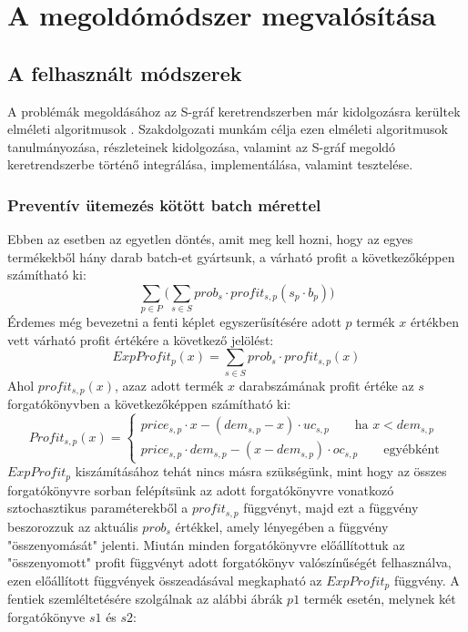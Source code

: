 \chapter{A megoldómódszer megvalósítása}  \label{Problem_impl}
\section{A felhasznált módszerek} \label{math_modells}
A problémák megoldásához az S-gráf keretrendszerben már kidolgozásra kerültek elméleti algoritmusok \cite{phd_Hegyhati}.
Szakdolgozati munkám célja ezen elméleti algoritmusok tanulmányozása, részleteinek kidolgozása, valamint az S-gráf megoldó keretrendszerbe történő integrálása, implementálása, valamint tesztelése.
\subsection{Preventív ütemezés kötött batch mérettel} \label{FixBatchSize}
Ebben az esetben az egyetlen döntés, amit meg kell hozni, hogy az egyes termékekből hány darab batch-et gyártsunk, a várható profit a következőképpen számítható ki:
$$\sum_{p \in P}\bigg (\sum_{s \in S} prob_s \cdot profit_{s,p} (s_p \cdot b_p)\bigg)$$
Érdemes még bevezetni a fenti képlet egyszerűsítésére adott $p$ termék $x$ értékben vett várható profit értékére a következő jelölést:
$$ExpProfit_p(x)=\sum_{s \in S}prob_s \cdot profit_{s,p}(x)$$
Ahol $profit_{s,p}(x)$, azaz adott termék $x$ darabszámának profit értéke az $s$ forgatókönyvben a következőképpen számítható ki: 
\begin{equation*}
Profit_{s,p}(x)= \begin{cases}
            price_{s,p}\cdot x-(dem_{s,p}-x) \cdot uc_{s,p}\qquad \text{ha } x<dem_{s,p} \\
            price_{s,p} \cdot dem_{s,p}-(x-dem_{s,p}) \cdot oc_{s,p}\qquad \text{egyébként}
       \end{cases}
\end{equation*}
$ExpProfit_p$ kiszámításához tehát nincs másra szükségünk, mint hogy az összes forgatókönyvre sorban felépítsünk az adott forgatókönyvre vonatkozó sztochasztikus paraméterekből a $profit_{s,p}$ függvényt, majd ezt a függvény beszorozzuk az aktuális $prob_s$ értékkel, amely lényegében a függvény "összenyomását" jelenti. 
Miután minden forgatókönyvre előállítottuk az "összenyomott" profit függvényt adott forgatókönyv valószínűségét felhasználva, ezen előállított függvények összeadásával megkapható az $ExpProfit_p$ függvény.
A fentiek szemléltetésére szolgálnak az alábbi ábrák $p1$ termék esetén, melynek két forgatókönyve $s1$ és $s2$:
